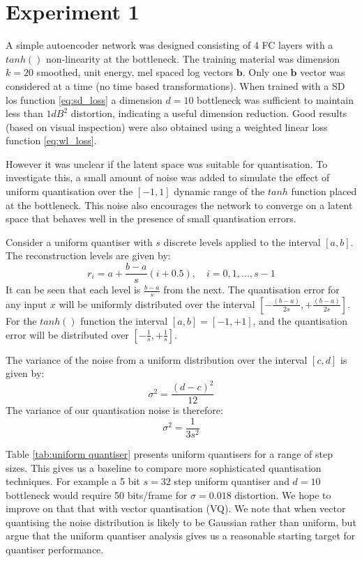 \documentclass{article}
\begin{document}
\section{Experiment 1}

A simple autoencoder network was designed consisting of 4 FC layers with a $tanh()$ non-linearity at the bottleneck.  The training material was dimension $k=20$ smoothed, unit energy, mel spaced log vectors $\mathbf{b}$.  Only one $\mathbf{b}$ vector was considered at a time (no time based transformations). When trained with a SD los function \ref{eq:sd_loss} a dimension $d=10$ bottleneck was sufficient to maintain less than $1 dB^2$ distortion, indicating a useful dimension reduction.  Good results (based on visual inspection) were also obtained using a weighted linear loss function \ref{eq:wl_loss}.

However it was unclear if the latent space was suitable for quantisation. To investigate this, a small amount of noise was added to simulate the effect of uniform quantisation over the $[-1,1]$ dynamic range of the $tanh$ function placed at the bottleneck.  This noise also encourages the network to converge on a latent space that behaves well in the presence of small quantisation errors.

Consider a uniform quantiser with $s$ discrete levels applied to the interval $[a,b]$.  The reconstruction levels are given by:
\begin{equation}
r_i = a + \frac{b-a}{s}(i+0.5), \quad i=0,1,...,s-1
\end{equation}
It can be seen that each level is $\frac{b-a}{s}$ from the next.  The quantisation error for any input $x$ will be uniformly distributed over the interval $[-\frac{(b-a)}{2s},+\frac{(b-a)}{2s}]$.  For the 
$tanh()$ function the interval $[a,b]=[-1,+1]$, and the quantisation error will be distributed over $[-\frac{1}{s}, + \frac{1}{s}]$. 

The variance of the noise from a uniform distribution over the interval $[c,d]$ is given by:
\begin{equation}
\sigma^2 = \frac{(d-c)^2}{12}
\end{equation}
The variance of our quantisation noise is therefore:
\begin{equation}
\sigma^2 = \frac{1}{3s^2}
\end{equation}

Table \ref{tab:uniform quantiser} presents uniform quantisers for a range of step sizes.  This gives us a baseline to compare more sophisticated quantisation techniques.  For example a 5 bit $s=32$ step uniform quantiser and $d=10$ bottleneck would require 50 bits/frame for $\sigma=0.018$ distortion. We hope to improve on that that with vector quantisation (VQ). We note that when vector quantising the noise distribution is likely to be Gaussian rather than uniform, but argue that the uniform quantiser analysis gives us a reasonable starting target for quantiser performance.
\end{document}
